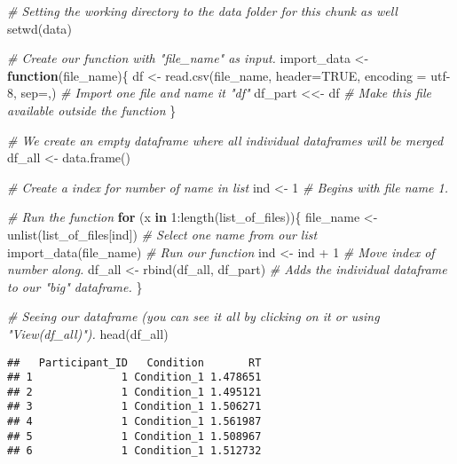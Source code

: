 \documentclass[
]{book}
\newenvironment{Shaded}{\begin{snugshade}}{\end{snugshade}}
\newcommand{\AttributeTok}[1]{\textcolor[rgb]{0.77,0.63,0.00}{#1}}
\newcommand{\CommentTok}[1]{\textcolor[rgb]{0.56,0.35,0.01}{\textit{#1}}}
\newcommand{\ConstantTok}[1]{\textcolor[rgb]{0.00,0.00,0.00}{#1}}
\newcommand{\ControlFlowTok}[1]{\textcolor[rgb]{0.13,0.29,0.53}{\textbf{#1}}}
\newcommand{\DecValTok}[1]{\textcolor[rgb]{0.00,0.00,0.81}{#1}}
\newcommand{\FunctionTok}[1]{\textcolor[rgb]{0.00,0.00,0.00}{#1}}
\newcommand{\NormalTok}[1]{#1}
\newcommand{\OtherTok}[1]{\textcolor[rgb]{0.56,0.35,0.01}{#1}}
\newcommand{\SpecialCharTok}[1]{\textcolor[rgb]{0.00,0.00,0.00}{#1}}
\newcommand{\StringTok}[1]{\textcolor[rgb]{0.31,0.60,0.02}{#1}}
\begin{document}
\begin{Shaded}
\begin{Highlighting}[]
\CommentTok{\# Setting the working directory to the data folder for this chunk as well}
\FunctionTok{setwd}\NormalTok{(}\StringTok{\textquotesingle{}data\textquotesingle{}}\NormalTok{)}

\CommentTok{\# Create our function with "file\_name" as input.}
\NormalTok{import\_data }\OtherTok{\textless{}{-}} \ControlFlowTok{function}\NormalTok{(file\_name)\{}
\NormalTok{  df }\OtherTok{\textless{}{-}} \FunctionTok{read.csv}\NormalTok{(file\_name, }\AttributeTok{header=}\ConstantTok{TRUE}\NormalTok{, }\AttributeTok{encoding =} \StringTok{\textquotesingle{}utf{-}8\textquotesingle{}}\NormalTok{, }\AttributeTok{sep=}\StringTok{\textquotesingle{},\textquotesingle{}}\NormalTok{)  }\CommentTok{\# Import one file and name it "df"}
\NormalTok{  df\_part }\OtherTok{\textless{}\textless{}{-}}\NormalTok{ df  }\CommentTok{\# Make this file available outside the function}
\NormalTok{\}}

\CommentTok{\# We create an empty dataframe where all individual dataframes will be merged}
\NormalTok{df\_all }\OtherTok{\textless{}{-}} \FunctionTok{data.frame}\NormalTok{() }

\CommentTok{\# Create a index for number of name in list}
\NormalTok{ind }\OtherTok{\textless{}{-}} \DecValTok{1}  \CommentTok{\# Begins with file name 1.}

\CommentTok{\# Run the function}
\ControlFlowTok{for}\NormalTok{ (x }\ControlFlowTok{in} \DecValTok{1}\SpecialCharTok{:}\FunctionTok{length}\NormalTok{(list\_of\_files))\{}
\NormalTok{  file\_name }\OtherTok{\textless{}{-}} \FunctionTok{unlist}\NormalTok{(list\_of\_files[ind])  }\CommentTok{\# Select one name from our list}
  \FunctionTok{import\_data}\NormalTok{(file\_name) }\CommentTok{\# Run our function }
\NormalTok{  ind }\OtherTok{\textless{}{-}}\NormalTok{ ind }\SpecialCharTok{+} \DecValTok{1}  \CommentTok{\# Move index of number along.}
\NormalTok{  df\_all }\OtherTok{\textless{}{-}} \FunctionTok{rbind}\NormalTok{(df\_all, df\_part)  }\CommentTok{\# Adds the individual dataframe to our "big" dataframe.}
\NormalTok{\}}

\CommentTok{\# Seeing our dataframe (you can see it all by clicking on it or using "View(df\_all)").}
\FunctionTok{head}\NormalTok{(df\_all)}
\end{Highlighting}
\end{Shaded}

\begin{verbatim}
##   Participant_ID   Condition       RT
## 1              1 Condition_1 1.478651
## 2              1 Condition_1 1.495121
## 3              1 Condition_1 1.506271
## 4              1 Condition_1 1.561987
## 5              1 Condition_1 1.508967
## 6              1 Condition_1 1.512732
\end{verbatim}
\end{document}

